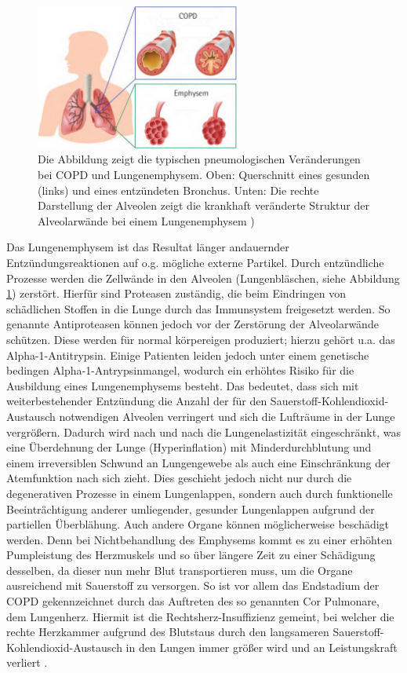 \begin{figure}
 \centering
  \includegraphics[width=0.6\textwidth]{copd_emphysem}
  \caption{Die Abbildung zeigt die typischen pneumologischen Veränderungen bei COPD und Lungenemphysem. Oben: Querschnitt eines gesunden (links) und eines entzündeten Bronchus. Unten: Die rechte Darstellung der Alveolen zeigt die krankhaft veränderte Struktur der Alveolarwände bei einem Lungenemphysem \cite[vgl.][16]{lingemann2014})}
  \label{fig:copd_emphysem}
\end{figure}

Das Lungenemphysem ist das Resultat länger andauernder Entzündungsreaktionen auf o.g. mögliche externe Partikel. Durch entzündliche Prozesse werden die Zellwände in den Alveolen (Lungenbläschen, siehe Abbildung \ref{fig:copd_emphysem}) zerstört. Hierfür sind Proteasen zuständig, die beim Eindringen von schädlichen Stoffen in die Lunge durch das Immunsystem freigesetzt werden. So genannte Antiproteasen können jedoch vor der Zerstörung der Alveolarwände schützen. Diese werden für normal körpereigen produziert; hierzu gehört u.a. das Alpha-1-Antitrypsin. Einige Patienten leiden jedoch unter einem genetische bedingen Alpha-1-Antrypsinmangel, wodurch ein erhöhtes Risiko für die Ausbildung eines Lungenemphysems besteht.
Das bedeutet, dass sich mit weiterbestehender Entzündung die Anzahl der für den Sauerstoff-Kohlendioxid-Austausch notwendigen Alveolen verringert und sich die Lufträume in der Lunge vergrößern. Dadurch wird nach und nach die Lungenelastizität eingeschränkt, was eine Überdehnung der Lunge (Hyperinflation) mit Minderdurchblutung und einem irreversiblen Schwund an Lungengewebe als auch eine Einschränkung der Atemfunktion nach sich zieht. Dies geschieht jedoch nicht nur durch die degenerativen Prozesse in einem Lungenlappen, sondern auch durch funktionelle Beeinträchtigung anderer umliegender, gesunder Lungenlappen aufgrund der partiellen Überblähung. Auch andere Organe können möglicherweise beschädigt werden. Denn bei Nichtbehandlung des Emphysems kommt es zu einer erhöhten Pumpleistung des Herzmuskels und so über längere Zeit zu einer Schädigung desselben, da dieser nun mehr Blut transportieren muss, um die Organe ausreichend mit Sauerstoff zu versorgen. So ist vor allem das Endstadium der COPD gekennzeichnet durch das Auftreten des so genannten Cor Pulmonare, dem Lungenherz. Hiermit ist die Rechtsherz-Insuffizienz gemeint, bei welcher die rechte Herzkammer aufgrund des Blutstaus durch den langsameren Sauerstoff-Kohlendioxid-Austausch in den Lungen immer größer wird und an Leistungskraft verliert \autocite[vgl.][e10]{vogelmeier2007}.

